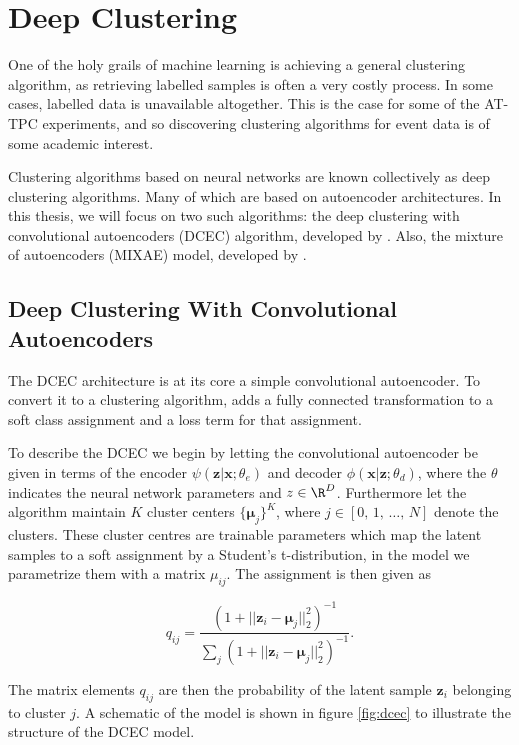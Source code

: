 \section{Deep Clustering}\label{sec:deep_clustering}

One of the holy grails of machine learning is achieving a general clustering algorithm, as retrieving labelled samples is often a very costly process. In some cases, labelled data is unavailable altogether. This is the case for some of the AT-TPC experiments, and so discovering clustering algorithms for event data is of some academic interest. 

Clustering algorithms based on neural networks are known collectively as deep clustering algorithms. Many of which are based on autoencoder architectures. In this thesis, we will focus on two such algorithms: the deep clustering with convolutional autoencoders (DCEC) algorithm, developed by \citet{Guo2017}. Also, the mixture of autoencoders (MIXAE) model, developed by \citet{Zhang}. 

\subsection{Deep Clustering With Convolutional Autoencoders}

The DCEC architecture is at its core a simple convolutional autoencoder. To convert it to a clustering algorithm, \citet{Guo2017} adds a fully connected transformation to a soft class assignment and a loss term for that assignment. 

To describe the DCEC we begin by letting the convolutional autoencoder be given in terms of the encoder $\psi(\mathbf{z}|\mathbf{x} ; \theta_e)$ and decoder $\phi(\mathbf{x}|\mathbf{z}; \theta_d)$, where the $\theta$ indicates the neural network parameters and $z \in \R^D$. Furthermore let the algorithm maintain $K$ cluster centers $\{\mathbf{\mu}_j\}^K$, where $j \in [0,\, 1,\, \dots,\, N]$ denote the clusters. These cluster centres are trainable parameters which map the latent samples to a soft assignment by a Student's t-distribution, in the model we parametrize them with a matrix $\mu_{ij}$. The assignment is then given as 

\begin{equation}\label{eq:qij}
q_{ij} = \frac{(1 + ||\mathbf{z}_i - \mathbf{\mu}_j||^2_2)^{-1}}{\sum_j(1 + ||\mathbf{z}_i - \mathbf{\mu}_j||^2_2)^{-1}}.
\end{equation}

\noindent The matrix elements $q_{ij}$ are then the probability of the latent sample $\mathbf{z}_i$ belonging to cluster $j$. A schematic of the model is shown in figure \ref{fig:dcec} to illustrate the structure of the DCEC model. 

